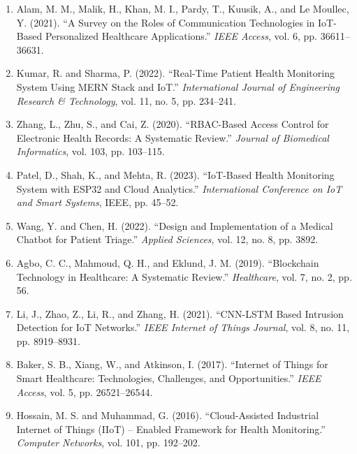 \documentclass[12pt,a4paper]{report}
\begin{document}
\begin{enumerate}[leftmargin=*]

\item Alam, M. M., Malik, H., Khan, M. I., Pardy, T., Kuusik, A., and Le Moullec, Y. (2021). ``A Survey on the Roles of Communication Technologies in IoT-Based Personalized Healthcare Applications.'' \textit{IEEE Access}, vol. 6, pp. 36611--36631.

\item Kumar, R. and Sharma, P. (2022). ``Real-Time Patient Health Monitoring System Using MERN Stack and IoT.'' \textit{International Journal of Engineering Research \& Technology}, vol. 11, no. 5, pp. 234--241.

\item Zhang, L., Zhu, S., and Cai, Z. (2020). ``RBAC-Based Access Control for Electronic Health Records: A Systematic Review.'' \textit{Journal of Biomedical Informatics}, vol. 103, pp. 103--115.

\item Patel, D., Shah, K., and Mehta, R. (2023). ``IoT-Based Health Monitoring System with ESP32 and Cloud Analytics.'' \textit{International Conference on IoT and Smart Systems}, IEEE, pp. 45--52.

\item Wang, Y. and Chen, H. (2022). ``Design and Implementation of a Medical Chatbot for Patient Triage.'' \textit{Applied Sciences}, vol. 12, no. 8, pp. 3892.

\item Agbo, C. C., Mahmoud, Q. H., and Eklund, J. M. (2019). ``Blockchain Technology in Healthcare: A Systematic Review.'' \textit{Healthcare}, vol. 7, no. 2, pp. 56.

\item Li, J., Zhao, Z., Li, R., and Zhang, H. (2021). ``CNN-LSTM Based Intrusion Detection for IoT Networks.'' \textit{IEEE Internet of Things Journal}, vol. 8, no. 11, pp. 8919--8931.

\item Baker, S. B., Xiang, W., and Atkinson, I. (2017). ``Internet of Things for Smart Healthcare: Technologies, Challenges, and Opportunities.'' \textit{IEEE Access}, vol. 5, pp. 26521--26544.

\item Hossain, M. S. and Muhammad, G. (2016). ``Cloud-Assisted Industrial Internet of Things (IIoT) -- Enabled Framework for Health Monitoring.'' \textit{Computer Networks}, vol. 101, pp. 192--202.


\end{enumerate}
\end{document}
